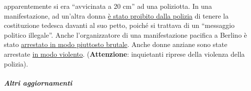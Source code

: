 \begin{itemize}
  apparentemente si era ``avvicinata a 20 cm'' ad una poliziotta. In una
  manifestazione, ad un'altra donna
  \href{https://twitter.com/ChristianFritze/status/1256609660318224385}{è
  stato proibito dalla polizia} di tenere la costituzione tedesca
  davanti al suo petto, poiché si trattava di un ``messaggio politico
  illegale''. Anche l'organizzatore di una manifestazione pacifica a
  Berlino è stato
  \href{https://www.youtube.com/watch?v=NbV2OH3uYxI}{arrestato in modo
  piuttosto brutale}. Anche donne anziane sono state arrestate
  \href{https://www.youtube.com/watch?v=Bn11jXTjh_Y}{in modo violento}.
  (\textbf{Attenzione}: inquietanti riprese della violenza della
  polizia).
\end{itemize}

\hypertarget{altri-aggiornamenti}{%
\subparagraph{\texorpdfstring{\textbf{Altri
aggiornamenti}}{Altri aggiornamenti}}\label{altri-aggiornamenti}}

